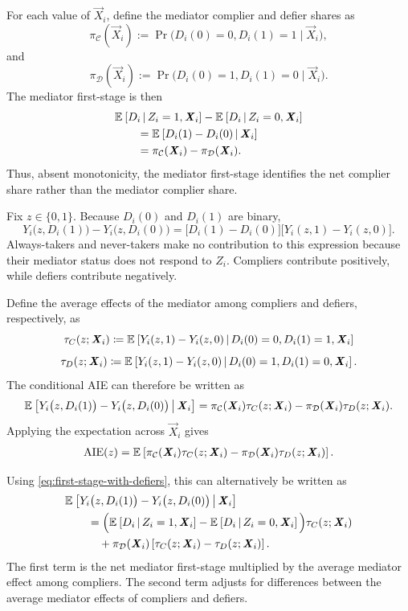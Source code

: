 For each value of \( \vec X_i\), define the mediator complier and defier shares as
\[
    \pi_{\mathcal C}( \vec X_i)
    :=
    \Pr\bigl(D_i(0)=0,D_i(1)=1 \mid \vec X_i\bigr),
\]
and
\[
    \pi_{\mathcal D}( \vec X_i)
    :=
    \Pr\bigl(D_i(0)=1,D_i(1)=0 \mid \vec X_i\bigr).
\]
The mediator first-stage is then
\begin{align}
    & \mathbb{E}_{} \left[ D_i  \, \middle\vert \,  Z_i=1, \boldsymbol{\mathit{X}}_i  \right]
    - \mathbb{E}_{} \left[ D_i  \, \middle\vert \,  Z_i=0, \boldsymbol{\mathit{X}}_i  \right]
    \notag\\
    &\qquad
    = \mathbb{E}_{} \left[ D_i(1)-D_i(0) \, \middle\vert \,  \boldsymbol{\mathit{X}}_i  \right]
    \notag\\
    &\qquad
    =
    \pi_{\mathcal C}( \boldsymbol{\mathit{X}}_i)-\pi_{\mathcal D}( \boldsymbol{\mathit{X}}_i).
    \label{eq:first-stage-with-defiers}
\end{align}
Thus, absent monotonicity, the mediator first-stage identifies the net complier share rather than the mediator complier share.

Fix $z \in \{0,1\}$. Because \(D_i(0)\) and \(D_i(1)\) are binary,
\[ Y_i\bigl(z,D_i(1)\bigr)
    -
    Y_i\bigl(z,D_i(0)\bigr)
    =
    \bigl[D_i(1)-D_i(0)\bigr]\bigl[Y_i(z, 1) - Y_i(z, 0)\bigr].
\]
Always-takers and never-takers make no contribution to this expression because their mediator status does not respond to \(Z_i\).
Compliers contribute positively, while defiers contribute negatively.

Define the average effects of the mediator among compliers and defiers, respectively, as
\[ \tau_C(z;\boldsymbol{\mathit{X}}_i)
    \coloneqq
    \mathbb{E}_{} \left[ Y_i(z, 1) - Y_i(z, 0) \, \middle\vert \,  
        D_i(0)=0,D_i(1)=1, \boldsymbol{\mathit{X}}_i \right]
\]
\[ \tau_D(z;\boldsymbol{\mathit{X}}_i)
    \coloneqq
    \mathbb{E}_{} \left[ Y_i(z, 1) - Y_i(z, 0) \, \middle\vert \,  
        D_i(0)=1,D_i(1)=0, \boldsymbol{\mathit{X}}_i \right].
\]
The conditional AIE can therefore be written as
\[ \mathbb{E}_{} \left[ 
        Y_i\bigl(z,D_i(1)\bigr)
        -
        Y_i\bigl(z,D_i(0)\bigr) \, \middle\vert \,  \boldsymbol{\mathit{X}}_i \right]
    =
    \pi_{\mathcal C}( \boldsymbol{\mathit{X}}_i)\tau_C(z;\boldsymbol{\mathit{X}}_i)
    -
    \pi_{\mathcal D}( \boldsymbol{\mathit{X}}_i)\tau_D(z;\boldsymbol{\mathit{X}}_i). \]
Applying the expectation across \( \vec X_i\) gives
\begin{align}
    \operatorname{AIE}(z)
    = \mathbb{E}_{} \left[ \pi_{\mathcal C}( \boldsymbol{\mathit{X}}_i)\tau_C( z;\boldsymbol{\mathit{X}}_i)
        - \pi_{\mathcal D}( \boldsymbol{\mathit{X}}_i)\tau_D( z;\boldsymbol{\mathit{X}}_i)  \right].
    \label{eq:unconditional-aie-with-defiers}
\end{align}

Using \autoref{eq:first-stage-with-defiers}, this can alternatively be written as
\begin{align}
    &\mathbb{E}_{} \left[ 
        Y_i\bigl(z,D_i(1)\bigr)
        -
        Y_i\bigl(z,D_i(0)\bigr) \, \middle\vert \,  \boldsymbol{\mathit{X}}_i  \right]
    \notag\\
    &\qquad
    =
    \Big(
        \mathbb{E}_{} \left[ D_i \, \middle\vert \,  Z_i=1, \boldsymbol{\mathit{X}}_i  \right]
        -
        \mathbb{E}_{} \left[ D_i \, \middle\vert \,  Z_i=0, \boldsymbol{\mathit{X}}_i  \right]
    \Big)
    \tau_C(z;\boldsymbol{\mathit{X}}_i)
    \notag\\
    &\qquad\quad
    +
    \pi_{\mathcal D}(\boldsymbol{\mathit{X}}_i)
    \left[
        \tau_C(z; \boldsymbol{\mathit{X}}_i)-\tau_D(z; \boldsymbol{\mathit{X}}_i)
    \right].
    \label{eq:aie-net-first-stage}
\end{align}
The first term is the net mediator first-stage multiplied by the average mediator effect among compliers.
The second term adjusts for differences between the average mediator effects of compliers and defiers.

